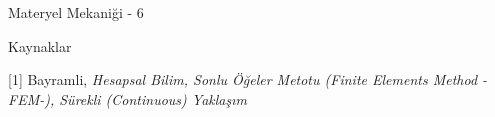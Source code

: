 \documentclass[12pt,fleqn]{article}\usepackage{../../common}
\begin{document}
Materyel Mekaniği - 6








Kaynaklar

[1] Bayramli, {\em Hesapsal Bilim, Sonlu Öğeler Metotu (Finite Elements Method -FEM-), Sürekli (Continuous) Yaklaşım}
\end{document}
